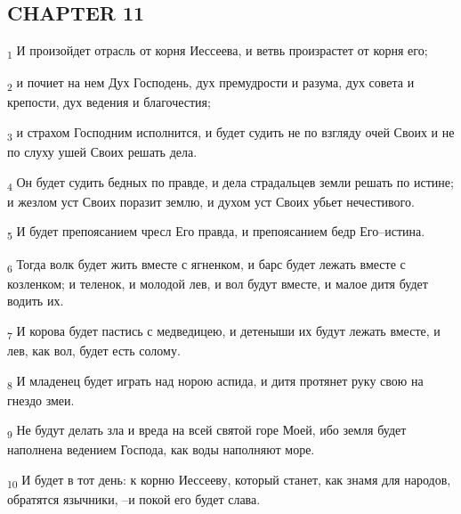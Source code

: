 \subsection{CHAPTER 11}
\begin{tcolorbox}
\textsubscript{1} И произойдет отрасль от корня Иессеева, и ветвь произрастет от корня его;
\end{tcolorbox}
\begin{tcolorbox}
\textsubscript{2} и почиет на нем Дух Господень, дух премудрости и разума, дух совета и крепости, дух ведения и благочестия;
\end{tcolorbox}
\begin{tcolorbox}
\textsubscript{3} и страхом Господним исполнится, и будет судить не по взгляду очей Своих и не по слуху ушей Своих решать дела.
\end{tcolorbox}
\begin{tcolorbox}
\textsubscript{4} Он будет судить бедных по правде, и дела страдальцев земли решать по истине; и жезлом уст Своих поразит землю, и духом уст Своих убьет нечестивого.
\end{tcolorbox}
\begin{tcolorbox}
\textsubscript{5} И будет препоясанием чресл Его правда, и препоясанием бедр Его--истина.
\end{tcolorbox}
\begin{tcolorbox}
\textsubscript{6} Тогда волк будет жить вместе с ягненком, и барс будет лежать вместе с козленком; и теленок, и молодой лев, и вол будут вместе, и малое дитя будет водить их.
\end{tcolorbox}
\begin{tcolorbox}
\textsubscript{7} И корова будет пастись с медведицею, и детеныши их будут лежать вместе, и лев, как вол, будет есть солому.
\end{tcolorbox}
\begin{tcolorbox}
\textsubscript{8} И младенец будет играть над норою аспида, и дитя протянет руку свою на гнездо змеи.
\end{tcolorbox}
\begin{tcolorbox}
\textsubscript{9} Не будут делать зла и вреда на всей святой горе Моей, ибо земля будет наполнена ведением Господа, как воды наполняют море.
\end{tcolorbox}
\begin{tcolorbox}
\textsubscript{10} И будет в тот день: к корню Иессееву, который станет, как знамя для народов, обратятся язычники, --и покой его будет слава.
\end{tcolorbox}
